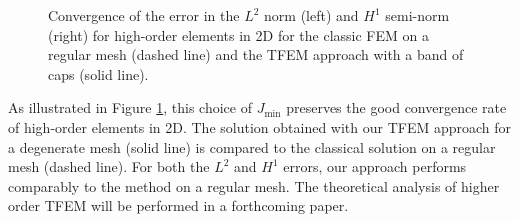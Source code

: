\documentclass{article}
\theoremstyle{remark}
\newcommand{\Jmin}{J_{\text{min}}}
\begin{document}
\begin{figure}[!ht]
        \caption{Convergence of the error in the $L^2$ norm (left) and $H^1$ semi-norm (right) for high-order elements in 2D for the classic FEM on a regular mesh (dashed line) and the TFEM approach with a band of caps (solid line).}
        \label{fig:conv_high_order_2D}
\end{figure}
    As illustrated in Figure \ref{fig:conv_high_order_2D}, this choice of $\Jmin$ preserves the good convergence rate of high-order elements in 2D. The solution obtained with our TFEM approach for a degenerate mesh (solid line) is compared to the classical solution on a regular mesh (dashed line). For both the $L^2$ and $H^1$ errors, our approach performs comparably to the method on a regular mesh. The theoretical analysis of higher order TFEM will be performed in a forthcoming paper.
    
\end{document}
